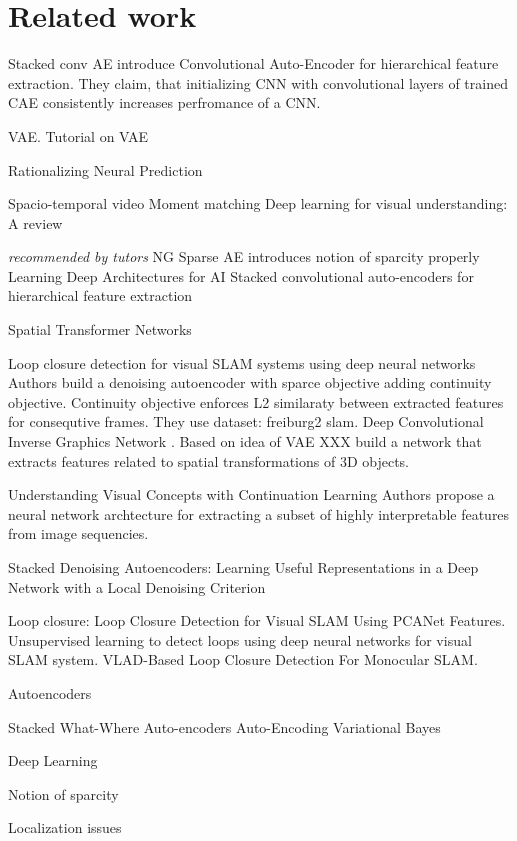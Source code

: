 
\chapter{Related work}
\label{ch:rewo}
Stacked conv AE \cite{Masci2011} introduce Convolutional Auto-Encoder for hierarchical feature extraction.
They claim, that initializing CNN with convolutional layers of trained CAE consistently increases perfromance of a CNN.

VAE. Tutorial on VAE \cite{Doersch2016}

Rationalizing Neural Prediction \cite{Lei2016}

Spacio-temporal video \cite{Patraucean2016}
Moment matching \cite{Li2015}
Deep learning for visual understanding: A review \cite{Guo2016}

\textit{recommended by tutors}
NG Sparse AE  \cite{Ng2011} introduces notion of sparcity properly
Learning Deep Architectures for AI \cite{Bengio2009}
Stacked convolutional auto-encoders for hierarchical feature extraction \cite{Masci2011}

Spatial Transformer Networks \cite{Jaderberg2015}

Loop closure detection for visual SLAM systems using deep neural networks \cite{Gao2015}
Authors build a denoising autoencoder with sparce objective adding continuity objective.
Continuity objective enforces L2 similaraty between extracted features for consequtive frames. They use dataset: freiburg2 slam.
Deep Convolutional Inverse Graphics Network \cite{Kulkarni2015}.
Based on idea of VAE XXX build a network that extracts features related to spatial transformations of 3D objects.

Understanding Visual Concepts with Continuation Learning \cite{Whitney2016}
Authors propose a neural network archtecture for extracting a subset of highly interpretable features
from image sequencies.

Stacked Denoising Autoencoders: Learning Useful Representations in a Deep Network with a Local Denoising Criterion \cite{Vincent2010}

Loop closure:
Loop Closure Detection for Visual SLAM Using PCANet Features.
Unsupervised learning to detect loops using deep neural networks for visual SLAM system.
VLAD-Based Loop Closure Detection For Monocular SLAM.
\cite{Xia2016, Gao2015a, Huang2016}



Autoencoders

Stacked What-Where Auto-encoders \cite{Zhao2015}
Auto-Encoding Variational Bayes \cite{Kingma2013}

Deep Learning \cite{LeCun2015}

Notion of sparcity


Localization issues
